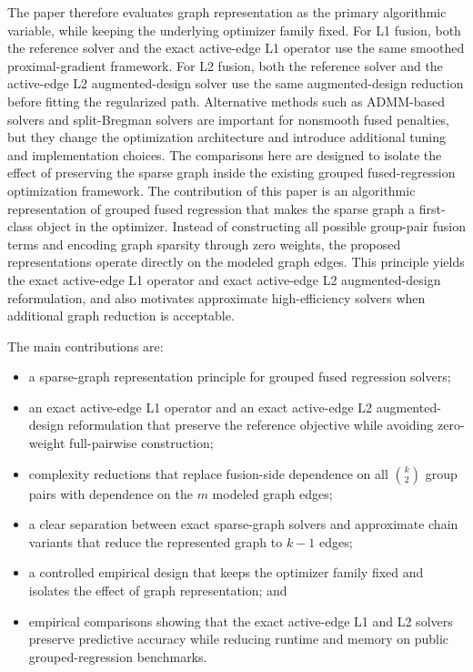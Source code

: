 \documentclass[twoside,11pt]{article}
\begin{document}
The paper therefore evaluates graph representation as the primary algorithmic variable, while keeping the underlying optimizer family fixed.
For L1 fusion, both the reference solver and the exact active-edge L1 operator use the same smoothed proximal-gradient framework. 
For L2 fusion, both the reference solver and the active-edge L2 augmented-design solver use the same augmented-design reduction before fitting the regularized path.
Alternative methods such as ADMM-based solvers \citep{boyd2011admm,hallac2015network} and split-Bregman solvers \citep{ye2011split} are important for nonsmooth fused penalties, but they change the optimization architecture and introduce additional tuning and implementation choices.
The comparisons here are designed to isolate the effect of preserving the sparse graph inside the existing grouped fused-regression optimization framework.
The contribution of this paper is an algorithmic representation of grouped fused regression that makes the sparse graph a first-class object in the optimizer. 
Instead of constructing all possible group-pair fusion terms and encoding graph sparsity through zero weights, the proposed representations operate directly on the modeled graph edges. 
This principle yields the exact active-edge L1 operator and exact active-edge L2 augmented-design reformulation, and also motivates approximate high-efficiency solvers when additional graph reduction is acceptable.

The main contributions are:
\begin{itemize}
\item a sparse-graph representation principle for grouped fused regression solvers;
\item an exact active-edge L1 operator and an exact active-edge L2 augmented-design reformulation that preserve the reference objective while avoiding zero-weight full-pairwise construction;
\item complexity reductions that replace fusion-side dependence on all \(\binom{k}{2}\) group pairs with dependence on the \(m\) modeled graph edges;
\item a clear separation between exact sparse-graph solvers and approximate chain variants that reduce the represented graph to \(k-1\) edges;
\item a controlled empirical design that keeps the optimizer family fixed and isolates the effect of graph representation; and
\item empirical comparisons showing that the exact active-edge L1 and L2 solvers preserve predictive accuracy while reducing runtime and memory on public grouped-regression benchmarks.
\end{itemize}
\end{document}
